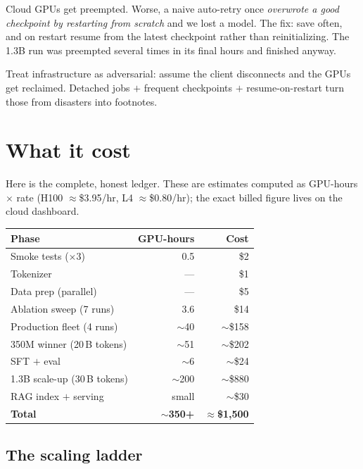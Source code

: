 \begin{gotcha}
Cloud GPUs get preempted. Worse, a naive auto-retry once \emph{overwrote a good checkpoint by restarting from
scratch} and we lost a model. The fix: save often, and on restart resume from the latest checkpoint rather
than reinitializing. The 1.3B run was preempted several times in its final hours and finished anyway.
\end{gotcha}

\begin{lesson}
Treat infrastructure as adversarial: assume the client disconnects and the GPUs get reclaimed. Detached jobs
$+$ frequent checkpoints $+$ resume-on-restart turn those from disasters into footnotes.
\end{lesson}

\chapter{What it cost}

Here is the complete, honest ledger. These are estimates computed as GPU-hours $\times$ rate (H100
$\approx$\$3.95/hr, L4 $\approx$\$0.80/hr); the exact billed figure lives on the cloud dashboard.

\begin{center}\small
\begin{tabular}{@{}lrr@{}}
\toprule
\textbf{Phase} & \textbf{GPU-hours} & \textbf{Cost}\\
\midrule
Smoke tests ($\times$3) & 0.5 & \$2\\
Tokenizer & --- & \$1\\
Data prep (parallel) & --- & \$5\\
Ablation sweep (7 runs) & 3.6 & \$14\\
Production fleet (4 runs) & $\sim$40 & $\sim$\$158\\
350M winner (20\,B tokens) & $\sim$51 & $\sim$\$202\\
SFT $+$ eval & $\sim$6 & $\sim$\$24\\
1.3B scale-up (30\,B tokens) & $\sim$200 & $\sim$\$880\\
RAG index $+$ serving & small & $\sim$\$30\\
\midrule
\textbf{Total} & $\sim$\textbf{350+} & $\approx$\textbf{\$1{,}500}\\
\bottomrule
\end{tabular}
\end{center}

\section{The scaling ladder}

